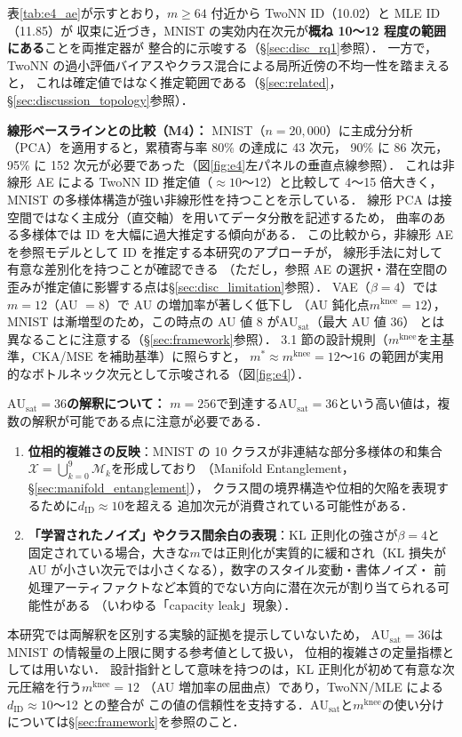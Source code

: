 \documentclass[12pt,a4paper]{jsarticle}
\newcommand{\dID}{d_{\mathrm{ID}}}
\newcommand{\dzopt}{m^*}                    %
\newcommand{\AUsat}{\mathrm{AU}_{\mathrm{sat}}}
\newcommand{\mknee}{m^{\mathrm{knee}}}      %
\begin{document}
表\ref{tab:e4_ae}が示すとおり，$m \geq 64$ 付近から TwoNN ID（10.02）と MLE ID（11.85）が
収束に近づき，MNIST の実効内在次元が\textbf{概ね 10〜12 程度の範囲にある}ことを両推定器が
整合的に示唆する（§\ref{sec:disc_rq1}参照）．
一方で，TwoNN の過小評価バイアスやクラス混合による局所近傍の不均一性を踏まえると，
これは確定値ではなく推定範囲である（§\ref{sec:related}，§\ref{sec:discussion_topology}参照）．

\textbf{線形ベースラインとの比較（M4）：}
MNIST（$n = 20{,}000$）に主成分分析（PCA）を適用すると，累積寄与率 80\% の達成に 43 次元，
90\% に 86 次元，95\% に 152 次元が必要であった（図\ref{fig:e4}左パネルの垂直点線参照）．
これは非線形 AE による TwoNN ID 推定値（$\approx 10$〜12）と比較して 4〜15 倍大きく，
MNIST の多様体構造が強い非線形性を持つことを示している．
線形 PCA は接空間ではなく主成分（直交軸）を用いてデータ分散を記述するため，
曲率のある多様体では ID を大幅に過大推定する傾向がある\cite{pope2021intrinsic}．
この比較から，非線形 AE を参照モデルとして ID を推定する本研究のアプローチが，
線形手法に対して有意な差別化を持つことが確認できる
（ただし，参照 AE の選択・潜在空間の歪みが推定値に影響する点は§\ref{sec:disc_limitation}参照）．
VAE（$\beta = 4$）では$m = 12$（AU $= 8$）で AU の増加率が著しく低下し
（AU 鈍化点$\mknee = 12$），MNIST は漸増型のため，この時点の AU 値 8 が$\AUsat$（最大 AU 値 36）
とは異なることに注意する（§\ref{sec:framework}参照）．
3.1 節の設計規則（$\mknee$を主基準，CKA/MSE を補助基準）に照らすと，
$\dzopt \approx \mknee = 12$〜$16$ の範囲が実用的なボトルネック次元として示唆される（図\ref{fig:e4}）．

\textbf{$\AUsat = 36$の解釈について：}
$m = 256$で到達する$\AUsat = 36$という高い値は，複数の解釈が可能である点に注意が必要である．
\begin{enumerate}
  \item \textbf{位相的複雑さの反映}：MNIST の 10 クラスが非連結な部分多様体の和集合
        $\mathcal{X} = \bigcup_{k=0}^{9}\mathcal{M}_k$を形成しており
        （Manifold Entanglement，§\ref{sec:manifold_entanglement}），
        クラス間の境界構造や位相的欠陥を表現するために$\dID \approx 10$を超える
        追加次元が消費されている可能性がある．
  \item \textbf{「学習されたノイズ」やクラス間余白の表現}：KL 正則化の強さが$\beta = 4$と
        固定されている場合，大きな$m$では正則化が実質的に緩和され（KL 損失が
        AU が小さい次元では小さくなる），数字のスタイル変動・書体ノイズ・
        前処理アーティファクトなど本質的でない方向に潜在次元が割り当てられる可能性がある
        （いわゆる「capacity leak」現象）．
\end{enumerate}
本研究では両解釈を区別する実験的証拠を提示していないため，
$\AUsat = 36$は MNIST の情報量の上限に関する参考値として扱い，
位相的複雑さの定量指標としては用いない．
設計指針として意味を持つのは，KL 正則化が初めて有意な次元圧縮を行う$\mknee = 12$
（AU 増加率の屈曲点）であり，TwoNN/MLE による$\dID \approx 10$〜12 との整合が
この値の信頼性を支持する．$\AUsat$と$\mknee$の使い分けについては§\ref{sec:framework}を参照のこと．
\end{document}
